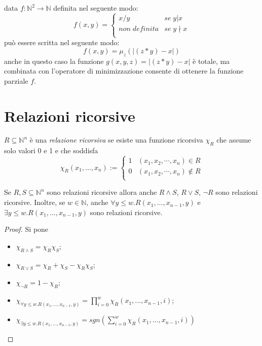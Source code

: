 \begin{esempio} data $f:\mathbb{N}^{2} \to \mathbb{N}$ definita nel seguente
modo:
$$f(x,y)= \left\{ \begin{array}{ll}
x/y & se \; y \vert x\\
non \; definita & se \; y \nmid x\\
\end{array} \right.$$
pu\`o essere scritta nel seguente modo:
$$f(x,y) = \mu_{z}(\vert (z*y) - x \vert) $$
anche in questo caso la funzione $g(x,y,z)=\vert (z*y) - x \vert$ \`e totale, ma
combinata con l'operatore di minimizzazione consente di ottenere la funzione
parziale $f$.
\end{esempio}

\section{Relazioni ricorsive}
\begin{defi} $R \subseteq \mathbb{N}^{n}$ è una \emph{relazione
ricorsiva} se esiste una funzione ricorsiva $\chi_R$ che assume solo valori 0 e
1 e che soddisfa
$$\chi_R(x_1, \ldots, x_n):= \left \{ \begin{array}{ll}
                                      1 & (x_{1}, x_{2}, \cdots, x_{n}) \in R\\
                                      0 & (x_{1}, x_{2}, \cdots, x_{n}) \not \in
 R\\
                                      \end{array} \right. $$
\end{defi}
\begin{prop} Se $R, S \subseteq \mathbb{N}^{n}$ sono relazioni
ricorsive allora anche $R\land S$, $R \vee S$, $\neg R$ sono relazioni
ricorsive. Inoltre, se $w \in \mathbb{N}$, anche $\forall y \leq
w. R(x_1, \ldots, x_{n-1}, y)$ e $\exists y \leq w. R(x_1, \ldots,
x_{n-1}, y)$ sono relazioni ricorsive.
\end{prop}
\begin{proof} Si pone
\begin{itemize}
\item $\chi_{R\land S} = \chi_R \chi_S$;
\item $\chi_{R\vee S} = \chi_R + \chi_S - \chi_R  \chi_S$;
\item $\chi_{\neg R} = 1 - \chi_R$;
\item $\chi_{\forall y
\leq w. R(x_1, \ldots, x_{n-1}, y)} = \prod_{i=0}^{w} \chi_R(x_1, \ldots,
x_{n-1},i)$;
\item $\chi_{\exists y
\leq w. R(x_1, \ldots, x_{n-1}, y)} = sgn(\sum_{i=0}^{w} \chi_R(x_1, \ldots,
x_{n-1},i))$
\end{itemize}
\end{proof}

